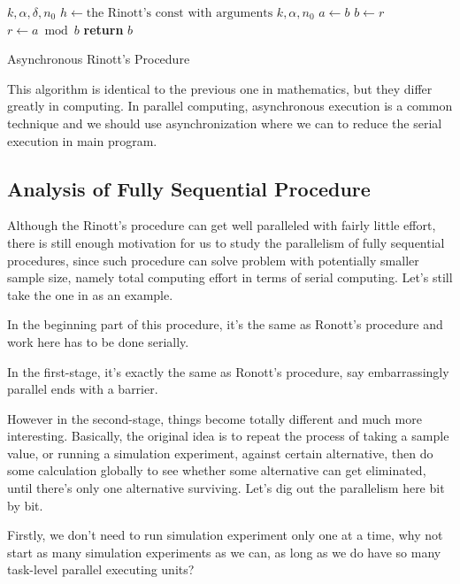 \begin{algorithm}
 \begin{algorithmic}[1]
 \Require $k, \alpha, \delta, n_0$
 \State $h \gets \text{the Rinott's const with arguments } k, \alpha, n_0$
 \State 
 \State $a\gets b$
 \State $b\gets r$
 \State $r\gets a\bmod b$
 \EndWhile
 \State \textbf{return} $b$ 
 \end{algorithmic}
 \caption{Asynchronous Rinott's Procedure}
 \label{async_rinott_alg}
\end{algorithm}

This algorithm is identical to the previous one in mathematics, but they differ greatly in computing. In parallel computing, asynchronous execution is a common technique and we should use asynchronization where we can to reduce the serial execution in main program.

\subsection{Analysis of Fully Sequential Procedure}

Although the Rinott's procedure can get well paralleled with fairly little effort, there is still enough motivation for us to study the parallelism of fully sequential procedures, since such procedure can solve problem with potentially smaller sample size, namely total computing effort in terms of serial computing. Let's still take the one in \cite{ras-seq-jeff} as an example.

In the beginning part of this procedure, it's the same as Ronott's procedure and work here has to be done serially.

In the first-stage, it's exactly the same as Ronott's procedure, say embarrassingly parallel ends with a barrier.

However in the second-stage, things become totally different and much more interesting. Basically, the original idea is to repeat the process of taking a sample value, or running a simulation experiment, against certain alternative, then do some calculation globally to see whether some alternative can get eliminated, until there's only one alternative surviving. Let's dig out the parallelism here bit by bit.

Firstly, we don't need to run simulation experiment only one at a time, why not start as many simulation experiments as we can, as long as we do have so many task-level parallel executing units?

